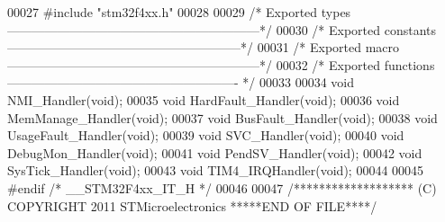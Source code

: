 \begin{DoxyCode}
00027 \textcolor{preprocessor}{#}\textcolor{preprocessor}{include} "stm32f4xx.h"
00028 
00029 \textcolor{comment}{/* Exported types ------------------------------------------------------------*/}
00030 \textcolor{comment}{/* Exported constants --------------------------------------------------------*/}
00031 \textcolor{comment}{/* Exported macro ------------------------------------------------------------*/}
00032 \textcolor{comment}{/* Exported functions ------------------------------------------------------- */}
00033 
00034 \textcolor{keywordtype}{void} NMI_Handler(\textcolor{keywordtype}{void});
00035 \textcolor{keywordtype}{void} HardFault_Handler(\textcolor{keywordtype}{void});
00036 \textcolor{keywordtype}{void} MemManage_Handler(\textcolor{keywordtype}{void});
00037 \textcolor{keywordtype}{void} BusFault_Handler(\textcolor{keywordtype}{void});
00038 \textcolor{keywordtype}{void} UsageFault_Handler(\textcolor{keywordtype}{void});
00039 \textcolor{keywordtype}{void} SVC_Handler(\textcolor{keywordtype}{void});
00040 \textcolor{keywordtype}{void} DebugMon_Handler(\textcolor{keywordtype}{void});
00041 \textcolor{keywordtype}{void} PendSV_Handler(\textcolor{keywordtype}{void});
00042 \textcolor{keywordtype}{void} SysTick_Handler(\textcolor{keywordtype}{void});
00043 \textcolor{keywordtype}{void} TIM4_IRQHandler(\textcolor{keywordtype}{void});
00044 
00045 \textcolor{preprocessor}{#}\textcolor{preprocessor}{endif} \textcolor{comment}{/* \_\_STM32F4xx\_IT\_H */}
00046 
00047 \textcolor{comment}{/******************* (C) COPYRIGHT 2011 STMicroelectronics *****END OF FILE****/}
\end{DoxyCode}
